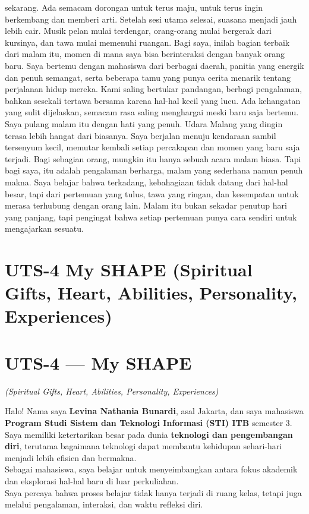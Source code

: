 \documentclass[
  letterpaper,
  DIV=11,
  numbers=noendperiod]{scrreprt}
\begin{document}
sekarang. Ada semacam dorongan untuk terus maju, untuk terus ingin
berkembang dan memberi arti. Setelah sesi utama selesai, suasana menjadi
jauh lebih cair. Musik pelan mulai terdengar, orang-orang mulai bergerak
dari kursinya, dan tawa mulai memenuhi ruangan. Bagi saya, inilah bagian
terbaik dari malam itu, momen di mana saya bisa berinteraksi dengan
banyak orang baru. Saya bertemu dengan mahasiswa dari berbagai daerah,
panitia yang energik dan penuh semangat, serta beberapa tamu yang punya
cerita menarik tentang perjalanan hidup mereka. Kami saling bertukar
pandangan, berbagi pengalaman, bahkan sesekali tertawa bersama karena
hal-hal kecil yang lucu. Ada kehangatan yang sulit dijelaskan, semacam
rasa saling menghargai meski baru saja bertemu. Saya pulang malam itu
dengan hati yang penuh. Udara Malang yang dingin terasa lebih hangat
dari biasanya. Saya berjalan menuju kendaraan sambil tersenyum kecil,
memutar kembali setiap percakapan dan momen yang baru saja terjadi. Bagi
sebagian orang, mungkin itu hanya sebuah acara malam biasa. Tapi bagi
saya, itu adalah pengalaman berharga, malam yang sederhana namun penuh
makna. Saya belajar bahwa terkadang, kebahagiaan tidak datang dari
hal-hal besar, tapi dari pertemuan yang tulus, tawa yang ringan, dan
kesempatan untuk merasa terhubung dengan orang lain. Malam itu bukan
sekadar penutup hari yang panjang, tapi pengingat bahwa setiap pertemuan
punya cara sendiri untuk mengajarkan sesuatu.


\chapter{UTS-4 My SHAPE (Spiritual Gifts, Heart, Abilities, Personality,
Experiences)}\label{uts-4-my-shape-spiritual-gifts-heart-abilities-personality-experiences}


\chapter{UTS-4 --- My SHAPE}\label{uts-4-my-shape}

\emph{(Spiritual Gifts, Heart, Abilities, Personality, Experiences)}

Halo! Nama saya \textbf{Levina Nathania Bunardi}, asal Jakarta, dan saya
mahasiswa \textbf{Program Studi Sistem dan Teknologi Informasi (STI)
ITB} semester 3.\\
Saya memiliki ketertarikan besar pada dunia \textbf{teknologi dan
pengembangan diri}, terutama bagaimana teknologi dapat membantu
kehidupan sehari-hari menjadi lebih efisien dan bermakna.\\
Sebagai mahasiswa, saya belajar untuk menyeimbangkan antara fokus
akademik dan eksplorasi hal-hal baru di luar perkuliahan.\\
Saya percaya bahwa proses belajar tidak hanya terjadi di ruang kelas,
tetapi juga melalui pengalaman, interaksi, dan waktu refleksi diri.
\end{document}
